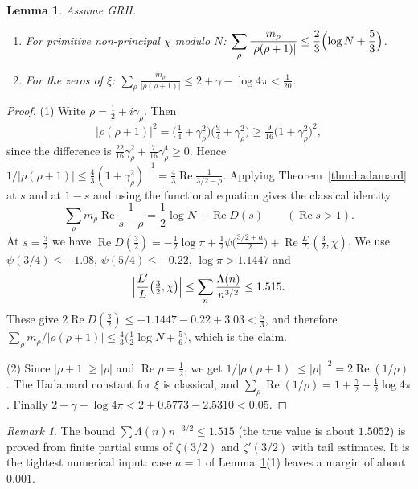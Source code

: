 \documentclass[11pt]{amsart}
\newtheorem{lemma}[theorem]{Lemma}
\theoremstyle{definition}
\theoremstyle{remark}
\newtheorem{remark}[theorem]{Remark}
\newcommand{\Lam}{\Lambda}
\renewcommand{\Re}{\operatorname{Re}}
\begin{document}
\begin{lemma}\label{lem:zerosum}
Assume GRH.
\begin{enumerate}
\item For primitive non-principal $\chi$ modulo $N$: $\displaystyle\sum_\rho\frac{m_\rho}{|\rho(\rho+1)|}\le\frac23\Bigl(\log N+\frac53\Bigr)$.
\item For the zeros of $\xi$: $\displaystyle\sum_\rho\frac{m_\rho}{|\rho(\rho+1)|}\le 2+\gamma-\log4\pi<\frac1{20}$.
\end{enumerate}
\end{lemma}
\begin{proof}
(1) Write $\rho=\tfrac12+i\gamma_\rho$. Then
\[
|\rho(\rho+1)|^2=\bigl(\tfrac14+\gamma_\rho^2\bigr)\bigl(\tfrac94+\gamma_\rho^2\bigr)\ge\tfrac9{16}\bigl(1+\gamma_\rho^2\bigr)^2,
\]
since the difference is $\tfrac{22}{16}\gamma_\rho^2+\tfrac7{16}\gamma_\rho^4\ge0$. Hence $1/|\rho(\rho+1)|\le\tfrac43(1+\gamma_\rho^2)^{-1}=\tfrac43\Re\frac1{3/2-\rho}$. Applying Theorem~\ref{thm:hadamard} at $s$ and at $1-s$ and using the functional equation gives the classical identity
\[
\sum_\rho m_\rho\Re\frac1{s-\rho}=\frac12\log N+\Re D(s)\qquad(\Re s>1).
\]
At $s=\tfrac32$ we have $\Re D(\tfrac32)=-\tfrac12\log\pi+\tfrac12\psi\bigl(\tfrac{3/2+a}{2}\bigr)+\Re\frac{L'}{L}(\tfrac32,\chi)$. We use $\psi(3/4)\le-1.08$, $\psi(5/4)\le-0.22$, $\log\pi>1.1447$ and
\[
\Bigl|\frac{L'}{L}\bigl(\tfrac32,\chi\bigr)\Bigr|\le\sum_n\frac{\Lam(n)}{n^{3/2}}\le1.515 .
\]
These give $2\Re D(\tfrac32)\le-1.1447-0.22+3.03<\tfrac53$, and therefore $\sum_\rho m_\rho/|\rho(\rho+1)|\le\tfrac43\bigl(\tfrac12\log N+\tfrac56\bigr)$, which is the claim.

(2) Since $|\rho+1|\ge|\rho|$ and $\Re\rho=\tfrac12$, we get $1/|\rho(\rho+1)|\le|\rho|^{-2}=2\Re(1/\rho)$. The Hadamard constant for $\xi$ is classical, and $\sum_\rho\Re(1/\rho)=1+\tfrac\gamma2-\tfrac12\log4\pi$ \cite[Ch.~12]{davenport}. Finally $2+\gamma-\log 4\pi<2+0.5773-2.5310<0.05$.
\end{proof}

\begin{remark}
The bound $\sum\Lam(n)n^{-3/2}\le1.515$ (the true value is about $1.5052$) is proved from finite partial sums of $\zeta(3/2)$ and $\zeta'(3/2)$ with tail estimates. It is the tightest numerical input: case $a=1$ of Lemma~\ref{lem:zerosum}(1) leaves a margin of about $0.001$.
\end{remark}
\end{document}
